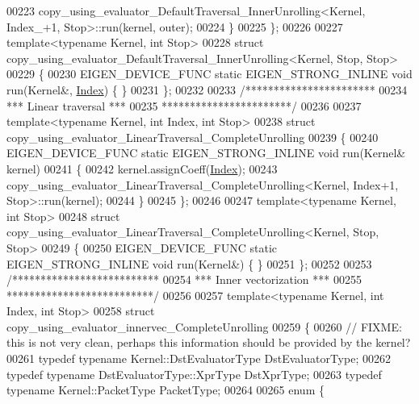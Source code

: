 \begin{DoxyCode}
00223     copy\_using\_evaluator\_DefaultTraversal\_InnerUnrolling<Kernel, Index\_+1, Stop>::run(kernel, outer);
00224   \}
00225 \};
00226 
00227 \textcolor{keyword}{template}<\textcolor{keyword}{typename} Kernel, \textcolor{keywordtype}{int} Stop>
00228 \textcolor{keyword}{struct }copy\_using\_evaluator\_DefaultTraversal\_InnerUnrolling<Kernel, Stop, Stop>
00229 \{
00230   EIGEN\_DEVICE\_FUNC \textcolor{keyword}{static} EIGEN\_STRONG\_INLINE \textcolor{keywordtype}{void} run(Kernel&, \hyperlink{namespace_eigen_a62e77e0933482dafde8fe197d9a2cfde}{Index}) \{ \}
00231 \};
00232 
00233 \textcolor{comment}{/***********************}
00234 \textcolor{comment}{*** Linear traversal ***}
00235 \textcolor{comment}{***********************/}
00236 
00237 \textcolor{keyword}{template}<\textcolor{keyword}{typename} Kernel, \textcolor{keywordtype}{int} Index, \textcolor{keywordtype}{int} Stop>
00238 \textcolor{keyword}{struct }copy\_using\_evaluator\_LinearTraversal\_CompleteUnrolling
00239 \{
00240   EIGEN\_DEVICE\_FUNC \textcolor{keyword}{static} EIGEN\_STRONG\_INLINE \textcolor{keywordtype}{void} run(Kernel& kernel)
00241   \{
00242     kernel.assignCoeff(\hyperlink{namespace_eigen_a62e77e0933482dafde8fe197d9a2cfde}{Index});
00243     copy\_using\_evaluator\_LinearTraversal\_CompleteUnrolling<Kernel, Index+1, Stop>::run(kernel);
00244   \}
00245 \};
00246 
00247 \textcolor{keyword}{template}<\textcolor{keyword}{typename} Kernel, \textcolor{keywordtype}{int} Stop>
00248 \textcolor{keyword}{struct }copy\_using\_evaluator\_LinearTraversal\_CompleteUnrolling<Kernel, Stop, Stop>
00249 \{
00250   EIGEN\_DEVICE\_FUNC \textcolor{keyword}{static} EIGEN\_STRONG\_INLINE \textcolor{keywordtype}{void} run(Kernel&) \{ \}
00251 \};
00252 
00253 \textcolor{comment}{/**************************}
00254 \textcolor{comment}{*** Inner vectorization ***}
00255 \textcolor{comment}{**************************/}
00256 
00257 \textcolor{keyword}{template}<\textcolor{keyword}{typename} Kernel, \textcolor{keywordtype}{int} Index, \textcolor{keywordtype}{int} Stop>
00258 \textcolor{keyword}{struct }copy\_using\_evaluator\_innervec\_CompleteUnrolling
00259 \{
00260   \textcolor{comment}{// FIXME: this is not very clean, perhaps this information should be provided by the kernel?}
00261   \textcolor{keyword}{typedef} \textcolor{keyword}{typename} Kernel::DstEvaluatorType DstEvaluatorType;
00262   \textcolor{keyword}{typedef} \textcolor{keyword}{typename} DstEvaluatorType::XprType DstXprType;
00263   \textcolor{keyword}{typedef} \textcolor{keyword}{typename} Kernel::PacketType PacketType;
00264   
00265   \textcolor{keyword}{enum} \{

\end{DoxyCode}
